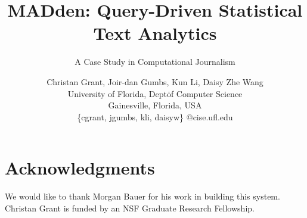 \documentclass{sig-alternate}
\newcommand{\system}{MADden\xspace}
\begin{document}
\title{\system: Query-Driven Statistical Text Analytics}
\subtitle{A Case Study in Computational Journalism}


\author{Christan Grant, Joir-dan Gumbs, Kun Li, Daisy Zhe Wang \\
    University of Florida, Dept\. of Computer Science \\
    Gainesville, Florida, USA \\
    \{cgrant, jgumbs, kli, daisyw\} @cise.ufl.edu
}




\maketitle







%





%
\section{Acknowledgments}
We would like to thank Morgan Bauer for his work in building this system.
Christan Grant is funded by an NSF Graduate Research Fellowship.


\begin{small}

\end{small}
\end{document}
